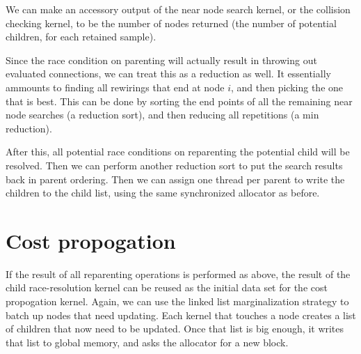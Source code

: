 We can make an accessory output of the near node search kernel, or the collision checking kernel, to be the number of nodes returned (the number of potential children, for each retained sample). 

Since the race condition on parenting will actually result in throwing out evaluated connections, we can treat this as a reduction as well. It essentially ammounts to finding all rewirings that end at node $i$, and then picking the one that is best. This can be done by sorting the end points of all the remaining near node searches (a reduction sort), and then reducing all repetitions (a min reduction). 

\begin{figure}[H]
\begin{centering}
    \texttt{[image: \\figfile\{fig/kernel\_near\_rotate]}}
    \caption{Near Reduction}
\end{centering} 
\end{figure}


After this, all potential race conditions on reparenting the potential child will be resolved. Then we can perform another reduction sort to put the search results back in parent ordering. Then we can assign one thread per parent to write the children to the child list, using the same synchronized allocator as before. 
 
\begin{figure}[H]
\begin{centering}
    \texttt{[image: \\figfile\{fig/kernel\_parent\_rotate]}}
    \caption{Parent Reduction}
\end{centering} 
\end{figure} 


\section{Cost propogation}
If the result of all reparenting operations is performed as above, the result of the child race-resolution kernel can be reused as the initial data set for the cost propogation kernel. Again, we can use the linked list marginalization strategy to batch up nodes that need updating. Each kernel that touches a node creates a list of children that now need to be updated. Once that list is big enough, it writes that list to global memory, and asks the allocator for a new block. 







 